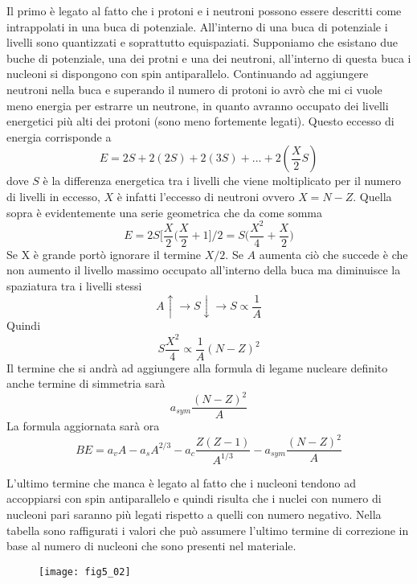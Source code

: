 Il primo è legato al fatto che i protoni e i neutroni possono essere descritti come intrappolati in una buca di potenziale.
All'interno di una buca di potenziale i livelli sono quantizzati e soprattutto equispaziati.
Supponiamo che esistano due buche di potenziale, una dei protni e una dei neutroni, all'interno di questa buca i nucleoni si dispongono con spin antiparallelo.
Continuando ad aggiungere neutroni nella buca e superando il numero di protoni io avrò che mi ci vuole meno energia per estrarre un neutrone, in quanto avranno occupato dei livelli energetici più alti dei protoni (sono meno fortemente legati).
Questo eccesso di energia corrisponde a 
\begin{equation}
E= 2S+ 2(2S)+2(3S)+ ...+ 2(\frac{X}{2}S)
\end{equation}
dove $S$ è la differenza energetica tra i livelli che viene moltiplicato per il numero di livelli in eccesso, $X$ è infatti l'eccesso di neutroni ovvero $X=N-Z$.
Quella sopra è evidentemente una serie geometrica che da come somma
\begin{equation}
E=2S\biggl[\frac{X}{2}\biggl(\frac{X}{2}+1\biggl]/2=S\biggl(\frac{X^2}{4}+\frac{X}{2}\biggl)
\end{equation}
Se X è grande portò ignorare il termine $X/2$.
Se $A$ aumenta ciò che succede è che non  aumento il livello massimo occupato all'interno della buca ma diminuisce la spaziatura tra i livelli stessi
\begin{equation}
A\uparrow \rightarrow S\downarrow \rightarrow S\propto \frac{1}{A}
\end{equation}
Quindi 
\begin{equation}
S\frac{X^2}{4}\propto \frac{1}{A}(N-Z)^2
\end{equation}
Il termine che si andrà ad aggiungere alla formula di legame nucleare definito anche termine di simmetria sarà
\begin{equation}
a_{sym}\frac{(N-Z)^2}{A}
\end{equation}
La formula aggiornata sarà ora
\begin{equation}
BE=a_vA-a_sA^{2/3}-a_c\frac{Z(Z-1)}{A^{1/3}}-a_{sym}\frac{(N-Z)^2}{A}
\end{equation} 

L'ultimo termine che manca è legato al fatto che i nucleoni tendono ad accoppiarsi con spin antiparallelo e quindi risulta che i nuclei con numero di nucleoni pari saranno più legati rispetto a quelli con numero negativo.
Nella tabella sono raffigurati i valori che può assumere l'ultimo termine di correzione in base al numero di nucleoni che sono presenti nel materiale.
\begin{figure}[h]
\centering
\texttt{[image: fig5\_02]}
\end{figure}

